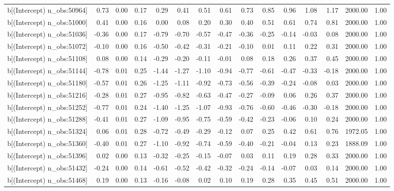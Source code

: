 \begin{table}[ht]
\begin{tabular}{rrrrrrrrrrrrrrr}
  b[(Intercept) n\_obs:50964] & 0.73 & 0.00 & 0.17 & 0.29 & 0.41 & 0.51 & 0.61 & 0.73 & 0.85 & 0.96 & 1.08 & 1.17 & 2000.00 & 1.00 \\ 
  b[(Intercept) n\_obs:51000] & 0.41 & 0.00 & 0.16 & 0.00 & 0.08 & 0.20 & 0.30 & 0.40 & 0.51 & 0.61 & 0.74 & 0.81 & 2000.00 & 1.00 \\ 
  b[(Intercept) n\_obs:51036] & -0.36 & 0.00 & 0.17 & -0.79 & -0.70 & -0.57 & -0.47 & -0.36 & -0.25 & -0.14 & -0.03 & 0.08 & 2000.00 & 1.00 \\ 
  b[(Intercept) n\_obs:51072] & -0.10 & 0.00 & 0.16 & -0.50 & -0.42 & -0.31 & -0.21 & -0.10 & 0.01 & 0.11 & 0.22 & 0.31 & 2000.00 & 1.00 \\ 
  b[(Intercept) n\_obs:51108] & 0.08 & 0.00 & 0.14 & -0.29 & -0.20 & -0.11 & -0.01 & 0.08 & 0.18 & 0.26 & 0.37 & 0.45 & 2000.00 & 1.00 \\ 
  b[(Intercept) n\_obs:51144] & -0.78 & 0.01 & 0.25 & -1.44 & -1.27 & -1.10 & -0.94 & -0.77 & -0.61 & -0.47 & -0.33 & -0.18 & 2000.00 & 1.00 \\ 
  b[(Intercept) n\_obs:51180] & -0.57 & 0.01 & 0.26 & -1.25 & -1.11 & -0.92 & -0.73 & -0.56 & -0.39 & -0.24 & -0.08 & 0.03 & 2000.00 & 1.00 \\ 
  b[(Intercept) n\_obs:51216] & -0.28 & 0.01 & 0.27 & -0.95 & -0.82 & -0.63 & -0.47 & -0.27 & -0.09 & 0.06 & 0.26 & 0.37 & 2000.00 & 1.00 \\ 
  b[(Intercept) n\_obs:51252] & -0.77 & 0.01 & 0.24 & -1.40 & -1.25 & -1.07 & -0.93 & -0.76 & -0.60 & -0.46 & -0.30 & -0.18 & 2000.00 & 1.00 \\ 
  b[(Intercept) n\_obs:51288] & -0.41 & 0.01 & 0.27 & -1.09 & -0.95 & -0.75 & -0.59 & -0.42 & -0.23 & -0.06 & 0.10 & 0.24 & 2000.00 & 1.00 \\ 
  b[(Intercept) n\_obs:51324] & 0.06 & 0.01 & 0.28 & -0.72 & -0.49 & -0.29 & -0.12 & 0.07 & 0.25 & 0.42 & 0.61 & 0.76 & 1972.05 & 1.00 \\ 
  b[(Intercept) n\_obs:51360] & -0.40 & 0.01 & 0.27 & -1.10 & -0.92 & -0.74 & -0.59 & -0.40 & -0.21 & -0.04 & 0.13 & 0.23 & 1888.09 & 1.00 \\ 
  b[(Intercept) n\_obs:51396] & 0.02 & 0.00 & 0.13 & -0.32 & -0.25 & -0.15 & -0.07 & 0.03 & 0.11 & 0.19 & 0.28 & 0.33 & 2000.00 & 1.00 \\ 
  b[(Intercept) n\_obs:51432] & -0.24 & 0.00 & 0.14 & -0.61 & -0.52 & -0.42 & -0.32 & -0.24 & -0.14 & -0.07 & 0.03 & 0.14 & 2000.00 & 1.00 \\ 
  b[(Intercept) n\_obs:51468] & 0.19 & 0.00 & 0.13 & -0.16 & -0.08 & 0.02 & 0.10 & 0.19 & 0.28 & 0.35 & 0.45 & 0.51 & 2000.00 & 1.00 \\ 

\end{tabular}
\end{table}

